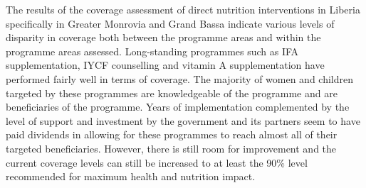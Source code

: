\documentclass[12pt,a4paper]{article}
\begin{document}
The results of the coverage assessment of direct nutrition interventions in Liberia specifically in Greater Monrovia and Grand Bassa indicate various levels of disparity in coverage both between the programme areas and within the programme areas assessed. Long-standing programmes such as IFA supplementation, IYCF counselling and vitamin A supplementation have performed fairly well in terms of coverage. The majority of women and children targeted by these programmes are knowledgeable of the programme and are beneficiaries of the programme. Years of implementation complemented by the level of support and investment by the government and its partners seem to have paid dividends in allowing for these programmes to reach almost all of their targeted beneficiaries. However, there is still room for improvement and the current coverage levels can still be increased to at least the 90\% level recommended for maximum health and nutrition impact.
\end{document}
